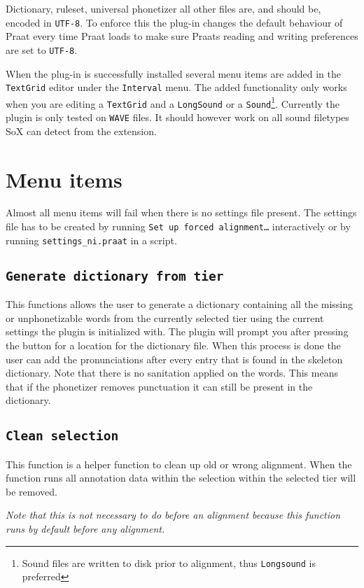 Dictionary, ruleset, universal phonetizer all other files are, and should be,
encoded in \texttt{UTF-8}. To enforce this the plug-in changes the default
behaviour of Praat every time Praat loads to make sure Praats reading and
writing preferences are set to \texttt{UTF-8}.

When the plug-in is successfully installed several menu items are added in the
\texttt{TextGrid} editor under the \texttt{Interval} menu. The added
functionality only works when you are editing a \texttt{TextGrid} and a
\texttt{LongSound} or a \texttt{Sound}\footnote{Sound files are written to disk
prior to alignment, thus \texttt{Longsound} is preferred}. Currently the plugin
is only tested on \texttt{WAVE} files. It should however work on all sound
filetypes SoX can detect from the extension.

\section{Menu items}
Almost all menu items will fail when there is no settings file present. The
settings file has to be created by running \texttt{Set up forced
alignment\ldots} interactively or by running \texttt{settings\_ni.praat} in a
script.

\subsection{\texttt{Generate dictionary from tier}}
This functions allows the user to generate a dictionary containing all the
missing or unphonetizable words from the currently selected tier using the
current settings the plugin is initialized with. The plugin will prompt you
after pressing the button for a location for the dictionary file. When this
process is done the user can add the pronunciations after every entry that
is found in the skeleton dictionary. Note that there is no sanitation
applied on the words. This means that if the phonetizer removes punctuation
it can still be present in the dictionary.

\subsection{\texttt{Clean selection}}
This function is a helper function to clean up old or wrong alignment. When the
function runs all annotation data within the selection within the selected tier
will be removed. 

\emph{Note that this is not necessary to do before an alignment because this
function runs by default before any alignment.}

